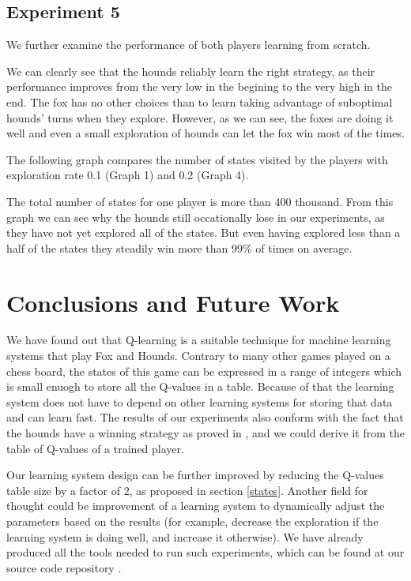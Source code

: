 \documentclass[a4paper]{article}
\begin{document}
\subsection{Experiment 5}
We further examine the performance of both players learning from scratch.









We can clearly see that the hounds reliably learn the right strategy, as their
performance improves from the very low in the begining to the very high in the
end. The fox has no other choices than to learn taking advantage of suboptimal
hounds' turns when they explore. However, as we can see, the foxes are doing it
well and even a small exploration of hounds can let the fox win most of the
times.

The following graph compares the number of states visited by the players with
exploration rate 0.1 (Graph 1) and 0.2 (Graph 4).



The total number of states for one player is more than 400 thousand. From this
graph we can see why the hounds still occationally lose in our experiments, as
they have not yet explored all of the states. But even having explored less
than a half of the states they steadily win more than 99\% of times on average.

\section{Conclusions and Future Work}
We have found out that Q-learning is a suitable technique for machine learning
systems that play Fox and Hounds. Contrary to many other games played on a chess
board, the states of this game can be expressed in a range of integers which is
small enuogh to store all the Q-values in a table. Because of that the learning
system does not have to depend on other learning systems for storing that data
and can learn fast. The results of our experiments also conform with the fact
that the hounds have a winning strategy as proved in \cite{berlekamp82}, and we
could derive it from the table of Q-values of a trained player.

Our learning system design can be further improved by reducing the Q-values
table size by a factor of 2, as proposed in section \ref{states}. Another field
for thought could be improvement of a learning system to dynamically adjust
the parameters based on the results (for example, decrease the exploration if
the learning system is doing well, and increase it otherwise). We have already
produced all the tools needed to run such experiments, which can be found at
our source code repository \cite{github}.
\end{document}
